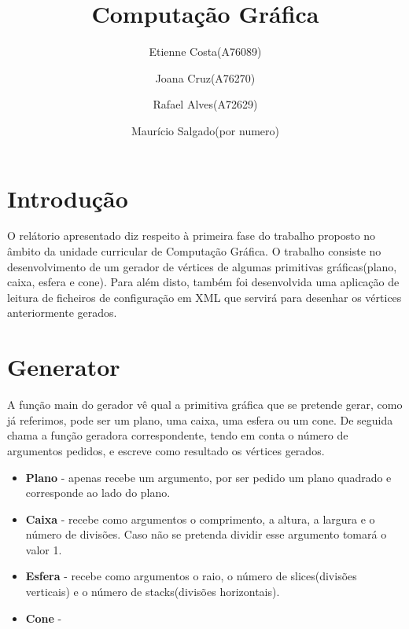 \documentclass{article}
\begin{document}
\title{Computação Gráfica}
\author{Etienne Costa(A76089) \and Joana Cruz(A76270) \and Rafael Alves(A72629) \and Maurício Salgado(por numero)}
\date{}
\maketitle
\newpage
\section{Introdução}
O relátorio apresentado diz respeito à primeira fase do trabalho proposto no âmbito da unidade curricular de Computação Gráfica. O trabalho
consiste no desenvolvimento de um gerador de vértices de algumas primitivas gráficas(plano, caixa, esfera e cone). Para além disto, também foi desenvolvida
uma aplicação de leitura de ficheiros de configuração em XML que servirá para desenhar os vértices anteriormente gerados.
\newpage
\section{Generator}
A função main do gerador vê qual a primitiva gráfica que se pretende gerar, como já referimos, pode ser um plano, uma caixa, uma esfera ou um cone.
De seguida chama a função geradora correspondente, tendo em conta o número de argumentos pedidos, e escreve como resultado os vértices gerados.\newline
\begin{itemize}
\item\textbf{Plano} - apenas recebe um argumento, por ser pedido um plano quadrado e corresponde ao lado do plano. 
\item\textbf{Caixa} - recebe como argumentos o comprimento, a altura, a largura e o número de divisões. Caso não se pretenda dividir esse argumento tomará o valor 1.
\item\textbf{Esfera} - recebe como argumentos o raio, o número de slices(divisões verticais) e o número de stacks(divisões horizontais).
\item\textbf{Cone} -
\end{itemize}
\newpage
\end{document}
